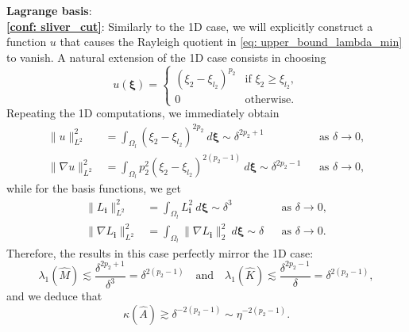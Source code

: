 \documentclass{article}
\numberwithin{equation}{section}
\newcommand{\dbxi}{d\bm{\xi}}
\theoremstyle{definition}
\begin{document}
\noindent\textbf{Lagrange basis}: \\
\noindent \textbf{\ref{conf: sliver_cut}}:
Similarly to the 1D case, we will explicitly construct a function $u$ that causes the Rayleigh quotient in \eqref{eq: upper_bound_lambda_min} to vanish. A natural extension of the 1D case consists in choosing
\begin{equation*}
    u(\bm{\xi}) =
    \begin{cases}
        (\xi_2-\xi_{l_2})^{p_2} & \text{if } \xi_2 \geq \xi_{l_2}, \\
        0 & \text{otherwise}.
    \end{cases}
\end{equation*}
Repeating the 1D computations, we immediately obtain
\begin{align*}
    \|u\|_{L^2}^2 &= \int_{\Omega_l} (\xi_2-\xi_{l_2})^{2p_2} \ \dbxi \sim \delta^{2p_2+1} & &\text{as } \delta \to 0, \\
    \|\nabla u\|_{L^2}^2 &= \int_{\Omega_l} p_2^2(\xi_2-\xi_{l_2})^{2(p_2-1)} \ \dbxi \sim \delta^{2p_2-1} & &\text{as } \delta \to 0,
\end{align*}
while for the basis functions, we get
\begin{align*}
    \|L_{\bm{i}}\|_{L^2}^2 &= \int_{\Omega_l} L_{\bm{i}}^2 \ \dbxi \sim \delta^{3} & &\text{as } \delta \to 0, \\
    \|\nabla L_{\bm{i}}\|_{L^2}^2 &= \int_{\Omega_l} \|\nabla L_{\bm{i}}\|_2^2 \ \dbxi \sim \delta & &\text{as } \delta \to 0.
\end{align*}
Therefore, the results in this case perfectly mirror the 1D case:
\begin{equation*}
    \lambda_1(\hat{M}) \lesssim \frac{\delta^{2p_2+1}}{\delta^3} = \delta^{2(p_2-1)} \quad \text{and} \quad \lambda_1(\hat{K}) \lesssim \frac{\delta^{2p_2-1}}{\delta} = \delta^{2(p_2-1)},
\end{equation*}
and we deduce that
\begin{equation*}
    \kappa(\hat{A}) \gtrsim \delta^{-2(p_2-1)} \sim \eta^{-2(p_2-1)}.
\end{equation*}
\end{document}
